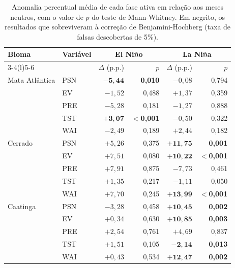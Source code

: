 \documentclass[a4paper,fleqn]{cas-sc}
\begin{document}
\begin{table}[width=\textwidth,cols=7,pos=t]
\caption{Anomalia percentual média de cada fase ativa em relação aos meses neutros, com o valor de $p$ do teste de Mann-Whitney. Em negrito, os resultados que sobreviveram à correção de Benjamini-Hochberg (taxa de falsas descobertas de 5\%).}
\label{tab:convencional}
\begin{tabular*}{\tblwidth}{@{}llrrrr@{}}
\toprule
Bioma & Variável & \multicolumn{2}{c}{El Niño} & \multicolumn{2}{c}{La Niña} \\
\cmidrule(lr){3-4}\cmidrule(l){5-6}
 & & $\Delta$ (p.p.) & $p$ & $\Delta$ (p.p.) & $p$ \\
\midrule
Mata Atlântica & PSN & $\mathbf{-5{,}44}$ & \textbf{0,010} & $-0{,}08$ & 0,794 \\
               & EV  & $-1{,}52$ & 0,488 & $+1{,}37$ & 0,359 \\
               & PRE & $-5{,}28$ & 0,181 & $-1{,}27$ & 0,888 \\
               & TST & $\mathbf{+3{,}07}$ & \textbf{$<$0,001} & $-0{,}50$ & 0,322 \\
               & WAI & $-2{,}49$ & 0,189 & $+2{,}44$ & 0,182 \\
\addlinespace
Cerrado        & PSN & $+5{,}26$ & 0,375 & $\mathbf{+11{,}75}$ & \textbf{0,001} \\
               & EV  & $+7{,}51$ & 0,080 & $\mathbf{+10{,}22}$ & \textbf{$<$0,001} \\
               & PRE & $+7{,}91$ & 0,875 & $-7{,}73$ & 0,461 \\
               & TST & $+1{,}35$ & 0,217 & $-1{,}11$ & 0,050 \\
               & WAI & $+7{,}70$ & 0,245 & $\mathbf{+13{,}99}$ & \textbf{$<$0,001} \\
\addlinespace
Caatinga       & PSN & $-3{,}28$ & 0,458 & $\mathbf{+10{,}45}$ & \textbf{0,002} \\
               & EV  & $+0{,}34$ & 0,630 & $\mathbf{+10{,}85}$ & \textbf{0,003} \\
               & PRE & $+2{,}54$ & 0,761 & $+4{,}69$ & 0,837 \\
               & TST & $+1{,}51$ & 0,105 & $\mathbf{-2{,}14}$ & \textbf{0,013} \\
               & WAI & $+0{,}43$ & 0,534 & $\mathbf{+12{,}47}$ & \textbf{0,002} \\
\bottomrule
\end{tabular*}
\end{table}
\end{document}

